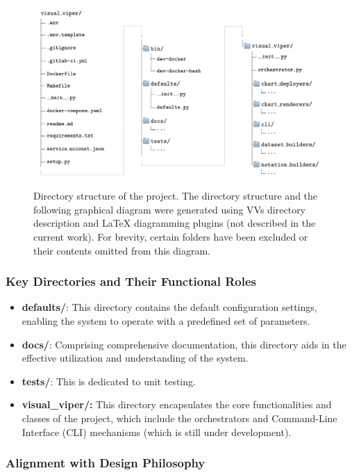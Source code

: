 \begin{figure}[ht]
  \centering
  \includegraphics[width=\textwidth]{media/fig10.png}
  \caption{Directory structure of the project. The directory structure
  and the following graphical diagram were generated using
  VV\textquotesingle s directory description and LaTeX diagramming plugins
  (not described in the current work). For brevity, certain folders have
  been excluded or their contents omitted from this diagram.}
  \label{fig:folders}
\end{figure}


\subsubsection{Key Directories and Their Functional
Roles}\label{key-directories-and-their-functional-roles}

\begin{itemize}
\item
  \textbf{defaults/}: This directory contains the default configuration
  settings, enabling the system to operate with a predefined set of
  parameters.
\item
  \textbf{docs/}: Comprising comprehensive documentation, this directory
  aids in the effective utilization and understanding of the system.
\item
  \textbf{tests/}: This is dedicated to unit testing.
\item
  \textbf{visual\_viper/:} This directory encapsulates the core
  functionalities and classes of the project, which include the
  orchestrators and Command-Line Interface (CLI) mechanisms (which is
  still under development).
\end{itemize}

\subsubsection{Alignment with Design
Philosophy}\label{alignment-with-design-philosophy}

